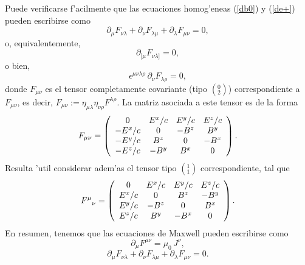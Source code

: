 Puede verificarse f'acilmente que las ecuaciones homog'eneas (\ref{db0}) y (\ref{de+}) pueden escribirse como
\begin{equation}
\partial_\mu F_{\nu\lambda}+\partial_\nu F_{\lambda\mu}+\partial_\lambda
F_{\mu\nu}=0,
\end{equation}
o, equivalentemente,
\begin{equation}
\partial_{[\mu}F_{\nu\lambda]}=0,
\end{equation}
o bien,
\begin{equation}
\epsilon^{\mu\nu\lambda\rho}\,\partial_{\nu}F_{\lambda\rho}=0,
\end{equation}
donde $F_{\mu\nu}$ es el tensor completamente covariante (tipo $(^0_2)$)
correspondiente a $F_{\mu\nu}$, es decir,
$F_{\mu\nu}:=\eta_{\mu\lambda}\eta_{\nu\rho}F^{\lambda\rho}$. La matriz asociada
a este tensor es de la forma
\begin{equation}
F_{\mu\nu}=\left(
\begin{array}
[c]{cccc}
0 & E^x/c & E^y/c & E^z/c\\
-E^x/c & 0 & -B^z & B^y\\
-E^y/c & B^z & 0 & -B^x\\
-E^z/c & -B^y & B^x & 0
\end{array}
\right). \label{Fdndn}
\end{equation}
Resulta 'util considerar adem'as el tensor tipo $(^1_1)$ correspondiente, tal que
\begin{equation}
F^\mu_{\ \ \nu}=\left(
\begin{array}
[c]{cccc}
0 & E^x/c & E^y/c & E^z/c\\
E^x/c & 0 & B^z & -B^y\\
E^y/c & -B^z & 0 & B^x\\
E^z/c & B^y & -B^x & 0
\end{array}
\right). \label{Fupdn}
\end{equation}
En resumen, tenemos que las ecuaciones de Maxwell pueden escribirse como
\begin{equation}
\boxed{\partial_\mu  F^{\mu \nu} = \mu_0\, J^\nu,} \label{emihF}
\end{equation}
\begin{equation}
\boxed{\partial_\mu F_{\nu\lambda}+\partial_\nu F_{\lambda\mu}+\partial_\lambda
F_{\mu\nu}=0.} \label{homcov}
\end{equation}

